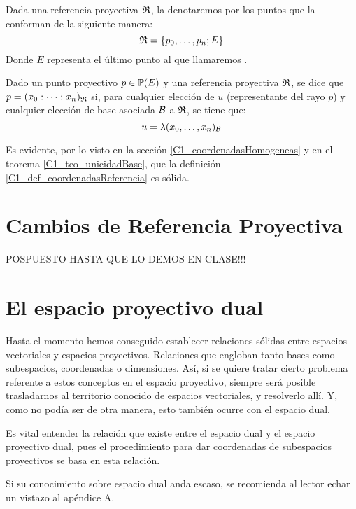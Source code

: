 Dada una referencia proyectiva $\mathfrak{R}$, la denotaremos por los puntos que la conforman de la siguiente manera:
\begin{equation}
\label{C1_eq_notacionReferencias}
\mathfrak{R}=\{p_0,\dots,p_n;E\}
\end{equation}
Donde $E$ representa el último punto al que llamaremos .
\begin{defi}
	\label{C1_def_coordenadasReferencia}
	Dado un punto proyectivo $p\in\mathbb{P}(E)$ y una referencia proyectiva $\mathfrak{R}$, se dice que $p=(x_0:\dots :x_n)_{\mathfrak{R}}$ si, para cualquier elección de $u$ (representante del rayo $p$) y cualquier elección de base asociada $\mathcal{B}$ a $\mathfrak{R}$, se tiene que:
	\[u=\lambda(x_0,\dots,x_n)_{\mathcal{B}}\]
\end{defi}
Es evidente, por lo visto en la sección \ref{C1_coordenadasHomogeneas} y en el teorema \ref{C1_teo_unicidadBase}, que la definición \ref{C1_def_coordenadasReferencia} es sólida.
\section{Cambios de Referencia Proyectiva}
POSPUESTO HASTA QUE LO DEMOS EN CLASE!!!
\section{El espacio proyectivo dual}
Hasta el momento hemos conseguido establecer relaciones sólidas entre espacios vectoriales y espacios proyectivos. Relaciones que engloban tanto bases como subespacios, coordenadas o dimensiones. Así, si se quiere tratar cierto problema referente a estos conceptos en el espacio proyectivo, siempre será posible trasladarnos al territorio conocido de espacios vectoriales, y resolverlo allí. Y, como no podía ser de otra manera, esto también ocurre con el espacio dual. 

Es vital entender la relación que existe entre el espacio dual y el espacio proyectivo dual, pues el procedimiento para dar coordenadas de subespacios proyectivos se basa en esta relación.

Si su conocimiento sobre espacio dual anda escaso, se recomienda al lector echar un vistazo al apéndice A.

